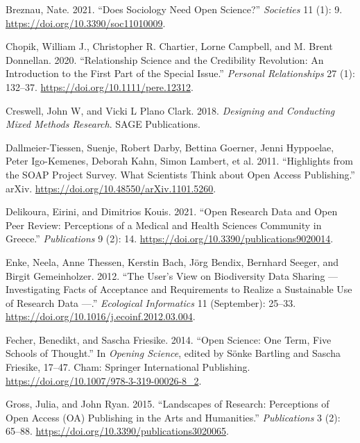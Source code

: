 \documentclass[
  letterpaper,
]{article}
\newlength{\cslhangindent}
\newenvironment{CSLReferences}[2] %
 {\begin{list}{}{%
  \setlength{\itemindent}{0pt}
  \setlength{\leftmargin}{0pt}
  \setlength{\parsep}{0pt}
  \ifodd #1
   \setlength{\leftmargin}{\cslhangindent}
   \setlength{\itemindent}{-1\cslhangindent}
  \fi
  \setlength{\itemsep}{#2\baselineskip}}}
 {\end{list}}
\begin{document}
\begin{CSLReferences}{1}{0}
Breznau, Nate. 2021. {``Does {Sociology Need Open Science}?''}
\emph{Societies} 11 (1): 9. \url{https://doi.org/10.3390/soc11010009}.

Chopik, William J., Christopher R. Chartier, Lorne Campbell, and M.
Brent Donnellan. 2020. {``Relationship Science and the Credibility
Revolution: {An} Introduction to the First Part of the Special Issue.''}
\emph{Personal Relationships} 27 (1): 132--37.
\url{https://doi.org/10.1111/pere.12312}.

Creswell, John W, and Vicki L Plano Clark. 2018. \emph{Designing and
{Conducting Mixed Methods Research}}. SAGE Publications.

Dallmeier-Tiessen, Suenje, Robert Darby, Bettina Goerner, Jenni
Hyppoelae, Peter Igo-Kemenes, Deborah Kahn, Simon Lambert, et al. 2011.
{``Highlights from the {SOAP} Project Survey. {What Scientists Think}
about {Open Access Publishing}.''} arXiv.
\url{https://doi.org/10.48550/arXiv.1101.5260}.

Delikoura, Eirini, and Dimitrios Kouis. 2021. {``Open {Research Data}
and {Open Peer Review}: {Perceptions} of a {Medical} and {Health
Sciences Community} in {Greece}.''} \emph{Publications} 9 (2): 14.
\url{https://doi.org/10.3390/publications9020014}.

Enke, Neela, Anne Thessen, Kerstin Bach, Jörg Bendix, Bernhard Seeger,
and Birgit Gemeinholzer. 2012. {``The User's View on Biodiversity Data
Sharing --- {Investigating} Facts of Acceptance and Requirements to
Realize a Sustainable Use of Research Data ---.''} \emph{Ecological
Informatics} 11 (September): 25--33.
\url{https://doi.org/10.1016/j.ecoinf.2012.03.004}.

Fecher, Benedikt, and Sascha Friesike. 2014. {``Open {Science}: {One
Term}, {Five Schools} of {Thought}.''} In \emph{Opening {Science}},
edited by Sönke Bartling and Sascha Friesike, 17--47. Cham: Springer
International Publishing.
\url{https://doi.org/10.1007/978-3-319-00026-8_2}.

Gross, Julia, and John Ryan. 2015. {``Landscapes of {Research}:
{Perceptions} of {Open Access} ({OA}) {Publishing} in the {Arts} and
{Humanities}.''} \emph{Publications} 3 (2): 65--88.
\url{https://doi.org/10.3390/publications3020065}.


\end{CSLReferences}
\end{document}
